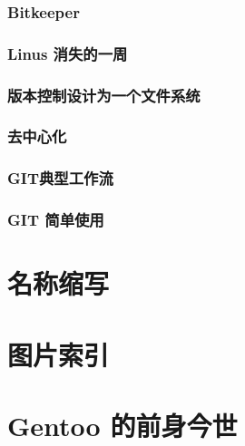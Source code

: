 \documentclass[amstex,twoside]{ctexbook}
\begin{document}
\subsection{  Bitkeeper	}
\subsection{  Linus 消失的一周	}
\subsection{  版本控制设计为一个文件系统	}
\subsection{ 去中心化	}
\subsection{  GIT典型工作流	}
\subsection{  GIT 简单使用	}


\appendix
\renewcommand{\thesection}{\arabic{section}}



\chapter{ 名称缩写	}
\chapter{ 图片索引	}
\chapter{ Gentoo 的前身今世}
\end{document}
